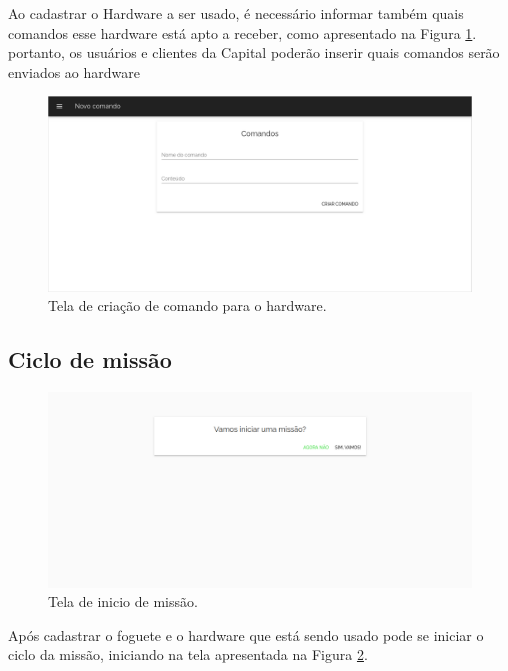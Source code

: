 Ao cadastrar o Hardware a ser usado, é necessário informar também quais comandos esse hardware está apto a receber, como apresentado na Figura \ref{fig:cria_comandos_hardware}. portanto, os usuários e clientes da Capital poderão inserir quais comandos serão enviados ao hardware
\begin{figure}[h!]
	\centering
		\includegraphics[keepaspectratio=true,scale=0.33]{figuras/telas_software/3.png}
	\caption{Tela de criação de comando para o hardware.}
	\label{fig:cria_comandos_hardware}
\end{figure}

\subsection{Ciclo de missão}

\begin{figure}[h!]
	\centering
		\includegraphics[keepaspectratio=true,scale=0.33]{figuras/telas_software/4.png}
	\caption{Tela de inicio de missão.}
	\label{fig:inicia_missao}
\end{figure}

Após cadastrar o foguete e o hardware que está sendo usado pode se iniciar o ciclo da missão, iniciando na tela apresentada na Figura \ref{fig:inicia_missao}.

